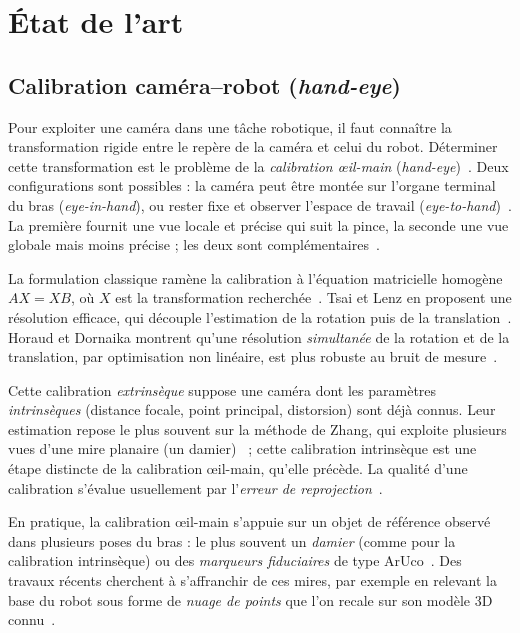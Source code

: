 \chapter{État de l'art}
\label{ch:etat}
\section{Calibration caméra--robot (\textit{hand-eye})}

Pour exploiter une caméra dans une tâche robotique, il faut connaître la transformation rigide entre le repère de la caméra et celui du robot. Déterminer cette transformation est le problème de la \emph{calibration œil-main} (\emph{hand-eye})~\cite{horaud_hand-eye_1995}. Deux configurations sont possibles : la caméra peut être montée sur l'organe terminal du bras (\emph{eye-in-hand}), ou rester fixe et observer l'espace de travail (\emph{eye-to-hand})~\cite{flandin_eye--handeye--hand_2000}. La première fournit une vue locale et précise qui suit la pince, la seconde une vue globale mais moins précise ; les deux sont complémentaires~\cite{flandin_eye--handeye--hand_2000}.

La formulation classique ramène la calibration à l'équation matricielle homogène $AX = XB$, où $X$ est la transformation recherchée~\cite{horaud_hand-eye_1995}. Tsai et Lenz en proposent une résolution efficace, qui découple l'estimation de la rotation puis de la translation~\cite{tsai_new_1989}. Horaud et Dornaika montrent qu'une résolution \emph{simultanée} de la rotation et de la translation, par optimisation non linéaire, est plus robuste au bruit de mesure~\cite{horaud_hand-eye_1995}.

Cette calibration \emph{extrinsèque} suppose une caméra dont les paramètres \emph{intrinsèques} (distance focale, point principal, distorsion) sont déjà connus. Leur estimation repose le plus souvent sur la méthode de Zhang, qui exploite plusieurs vues d'une mire planaire (un damier)~\cite{zhang_flexible_2000} ; cette calibration intrinsèque est une étape distincte de la calibration œil-main, qu'elle précède. La qualité d'une calibration s'évalue usuellement par l'\emph{erreur de reprojection}~\cite{noauthor_understanding_2022}.

En pratique, la calibration œil-main s'appuie sur un objet de référence observé dans plusieurs poses du bras : le plus souvent un \emph{damier} (comme pour la calibration intrinsèque) ou des \emph{marqueurs fiduciaires} de type ArUco~\cite{garrido-jurado_aruco_2014}. Des travaux récents cherchent à s'affranchir de ces mires, par exemple en relevant la base du robot sous forme de \emph{nuage de points} que l'on recale sur son modèle 3D connu~\cite{li_3d_2025}.

